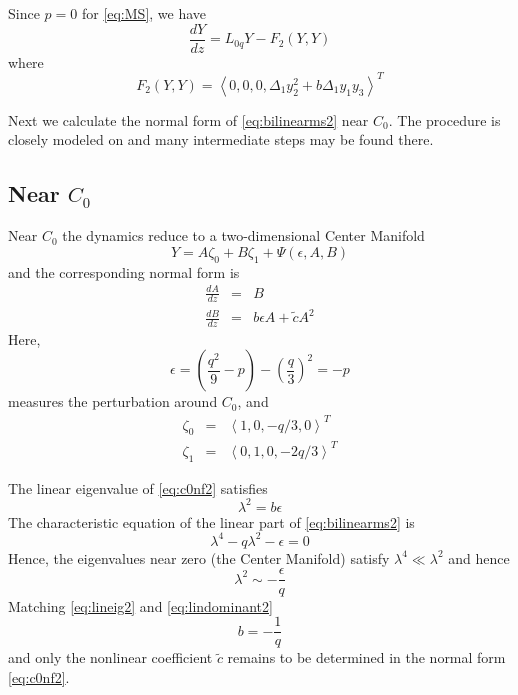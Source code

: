 Since $p=0$ for \eqref{eq:MS}, we have 
\begin{equation} \label{eq:bilinearms2}
 \frac{ dY }{ dz } = L_{0q} Y - F_2(Y,Y) 
\end{equation}
where 
\begin{equation}\label{eq:nonlinear2}
F_2(Y,Y) = \left<0,0,0,\Delta_1 y_2^2 + b \Delta_1 y_1 y_3 \right>^T
\end{equation}

Next we calculate the normal form of \eqref{eq:bilinearms2} near $C_0$. The procedure is
closely modeled on \cite{IA} and many intermediate steps may be found there. 

\subsection{ Near $C_0$ }
Near $C_0$ the dynamics reduce to a two-dimensional Center Manifold
\begin{equation}\label{eq:c0cm2}
 Y = A \zeta_0 + B \zeta_1 + \Psi(\epsilon,A,B)
\end{equation}
and the corresponding normal form is
\begin{subequations}\label{eq:c0nf2}
\begin{eqnarray}
\frac{dA}{dz} &=& B \label{eq:c0nf2a} \\
\frac{dB}{dz} &=& b \epsilon A + \tilde{c} A^2 \label{eq:c0nf2b}
\end{eqnarray}
\end{subequations}
Here,
\begin{equation}
\epsilon = \left( \frac{q^2}{9} - p\right) - \left(\frac{q}{3}\right)^2 = - p 
\end{equation}
measures the perturbation around $C_0$, and
\begin{subequations}\label{eq:lineareigs2}
\begin{eqnarray}
\zeta_0 &=& \left<1,0,-q/3,0\right>^T\\
\zeta_1 &=& \left<0,1,0,-2 q/3\right>^T 
\end{eqnarray}
\end{subequations}

The linear eigenvalue of \eqref{eq:c0nf2} satisfies 
\begin{equation}\label{eq:lineig2}
\lambda^2 = b \epsilon 
\end{equation}
The characteristic equation of the linear part of 
\eqref{eq:bilinearms2} is 
\begin{equation}\label{eq:charlinear2}
\lambda^4 - q \lambda^2 - \epsilon =  0 
\end{equation}
Hence, the eigenvalues near zero (the Center Manifold) satisfy $\lambda^4 \ll \lambda^2$ and hence 
\begin{equation}\label{eq:lindominant2}
\lambda^2 \sim -\frac{\epsilon}{q}
\end{equation}
Matching \eqref{eq:lineig2} and \eqref{eq:lindominant2} 
\begin{equation}
b = - \frac{1}{q}
\end{equation}
and only the nonlinear coefficient $\tilde{c}$ remains to be determined in the normal form \eqref{eq:c0nf2}.

